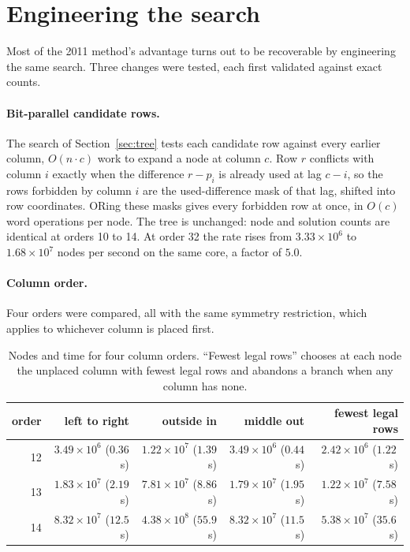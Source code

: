 \section{Engineering the search}
\label{sec:engineering}
Most of the 2011 method's advantage turns out to be recoverable by engineering the same search. Three
changes were tested, each first validated against exact counts.

\paragraph{Bit-parallel candidate rows.} The search of Section~\ref{sec:tree} tests each candidate row
against every earlier column, $O(n\cdot c)$ work to expand a node at column $c$. Row $r$ conflicts with
column $i$ exactly when the difference $r-p_i$ is already used at lag $c-i$, so the rows forbidden by
column $i$ are the used-difference mask of that lag, shifted into row coordinates. ORing these masks gives
every forbidden row at once, in $O(c)$ word operations per node. The tree is unchanged: node and
solution counts are identical at orders 10 to 14. At order 32 the rate rises from $3.33\times10^6$ to
$1.68\times10^7$ nodes per second on the same core, a factor of $5.0$.

\paragraph{Column order.} Four orders were compared, all with the same symmetry restriction, which applies
to whichever column is placed first.

\begin{table}[H]
\centering
\small
\begin{tabular}{@{}rrrrr@{}}
\toprule
order & left to right & outside in & middle out & fewest legal rows \\
\midrule
12 & $3.49\times10^6$ ($0.36$\,s) & $1.22\times10^7$ ($1.39$\,s) & $3.49\times10^6$ ($0.44$\,s) & $2.42\times10^6$ ($1.22$\,s) \\
13 & $1.83\times10^7$ ($2.19$\,s) & $7.81\times10^7$ ($8.86$\,s) & $1.79\times10^7$ ($1.95$\,s) & $1.22\times10^7$ ($7.58$\,s) \\
14 & $8.32\times10^7$ ($12.5$\,s) & $4.38\times10^8$ ($55.9$\,s) & $8.32\times10^7$ ($11.5$\,s) & $5.38\times10^7$ ($35.6$\,s) \\
\bottomrule
\end{tabular}
\caption{Nodes and time for four column orders. ``Fewest legal rows'' chooses at each node the unplaced
column with fewest legal rows and abandons a branch when any column has none.}
\label{tab:orders}
\end{table}


